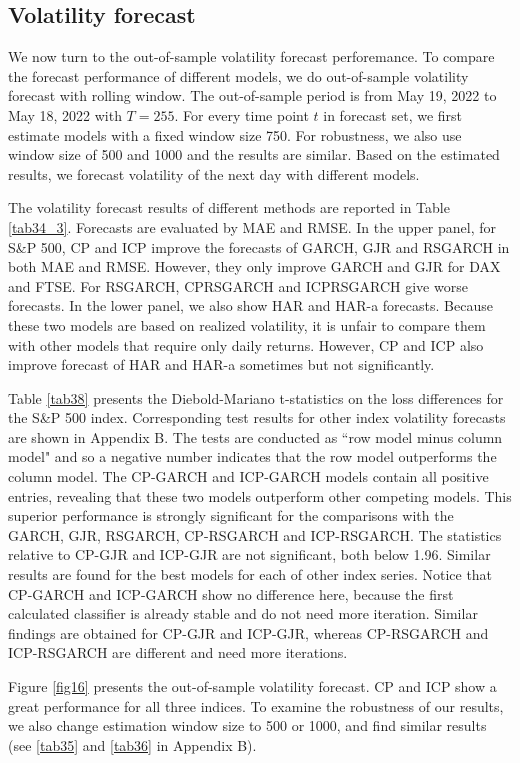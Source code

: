 \documentclass[preprint,12pt,authoryear]{elsarticle}
\begin{document}
\subsection{Volatility forecast}
We now turn to the out-of-sample volatility forecast perforemance.
To compare the forecast performance of different models, we do out-of-sample volatility forecast with rolling window. The out-of-sample period is from May 19, 2022 to May 18, 2022 with $T=255$. For every time point $t$ in forecast set, we first estimate models with a fixed window size 750. For robustness, we also use window size of 500 and 1000 and the results are similar. Based on the estimated results, we forecast volatility of the next day with different models.

The volatility forecast results of different methods are reported in Table \ref{tab34_3}.
Forecasts are evaluated by MAE and RMSE. In the upper panel, for S\&P 500, CP and ICP improve the forecasts of GARCH, GJR and RSGARCH in both MAE and RMSE. However, they only improve GARCH and GJR for DAX and FTSE. For RSGARCH, CPRSGARCH and ICPRSGARCH give worse forecasts.
In the lower panel, we also show HAR and HAR-a forecasts. Because these two models are based on realized volatility, it is unfair to compare them with other models that require only daily returns.
However, CP and ICP also improve forecast of HAR and HAR-a sometimes but not significantly.

Table \ref{tab38} presents the Diebold-Mariano t-statistics on the loss differences for the S\&P 500 index.
Corresponding test results for other index volatility forecasts are shown in Appendix B.
The tests are conducted as ``row model minus column model" and so a negative number indicates that the row model outperforms the column model. The CP-GARCH and ICP-GARCH models contain all positive entries, revealing that these two models outperform other competing models. This superior performance is strongly significant for the comparisons with the GARCH, GJR, RSGARCH, CP-RSGARCH and ICP-RSGARCH. The statistics relative to CP-GJR and ICP-GJR are not significant, both below 1.96. Similar results are found for the best models for each of other index series. Notice that CP-GARCH and ICP-GARCH show no difference here, because the first calculated classifier is already stable and do not need more iteration. Similar findings are obtained for CP-GJR and ICP-GJR, whereas CP-RSGARCH and ICP-RSGARCH are different and need more iterations.

Figure \ref{fig16} presents the out-of-sample volatility forecast. CP and ICP show a great performance for all three indices. To examine the robustness of our results, we also change estimation window size to 500 or 1000, and find similar results (see \ref{tab35} and \ref{tab36} in Appendix B).
\end{document}

